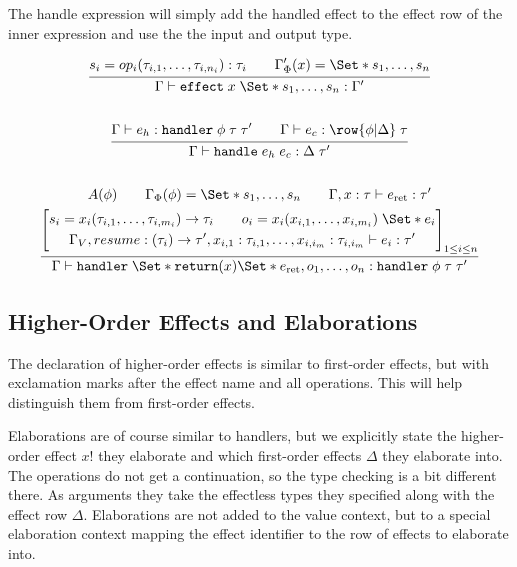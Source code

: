 The handle expression will simply add the handled effect to the effect row of the inner expression and use the the input and output type.

\begin{gather*}
    \infer{
        \Gamma \vdash \kw{effect}\;x\;\S{s_1, \dots, s_n}: \Gamma'
    }{
        s_i = op_i(\tau_{i,1},\dots, \tau_{i,n_i}): \tau_i
        \qquad
        \Gamma'_\Phi(x) = \S{s_1, \dots, s_n}
    }
    \\\\
    \infer{
        \Gamma \vdash \handle\;e_h\;e_c : \Delta\;\tau'
    }{
        \Gamma \vdash e_h : \handler\;\phi\;\tau\;\tau'
        \qquad
        \Gamma \vdash e_c : \row{\phi | \Delta}\;\tau
    }
    \\\\
    \infer{
        \Gamma \vdash \handler\;\S{ \return(x) \S{ e_{\text{ret}} }, o_1, \dots, o_n }
        : \handler\;\phi\;\tau\;\tau'
    }{
        A(\phi)
        \qquad
        \Gamma_\Phi(\phi) = \S{ s_1, \dots, s_n }
        \qquad
        \Gamma, x: \tau \vdash e_{\text{ret}} : \tau' 
        \\
        \left[
            \begin{gathered}
                s_i = x_i(\tau_{i,1}, \dots, \tau_{i,m_i}) \to \tau_i
                \qquad
                o_i = x_i(x_{i,1}, \dots, x_{i,m_i})\;\S{ e_i }
                \\
                \Gamma_V, resume : (\tau_i) \to \tau', x_{i,1}: \tau_{i,1}, \dots, x_{i,i_m}: \tau_{i,i_m} 
                \vdash e_i: \tau'
            \end{gathered}
        \right]_{1\leq i\leq n}
    }
\end{gather*}

\subsection{Higher-Order Effects and Elaborations}

The declaration of higher-order effects is similar to first-order effects, but with exclamation marks after the effect name and all operations. This will help distinguish them from first-order effects.

Elaborations are of course similar to handlers, but we explicitly state the higher-order effect $x!$ they elaborate and which first-order effects $\Delta$ they elaborate into. The operations do not get a continuation, so the type checking is a bit different there. As arguments they take the effectless types they specified along with the effect row $\Delta$. Elaborations are not added to the value context, but to a special elaboration context mapping the effect identifier to the row of effects to elaborate into.
\\

